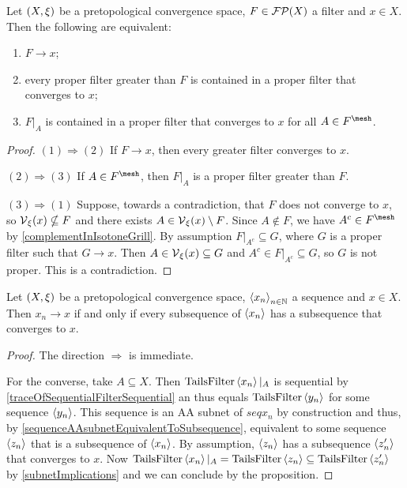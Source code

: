 \begin{proposition} \label{pretopologicalConvergenceDeterminedBySuperSuperFilters}
Let $\sSet{X,\xi}$ be a pretopological convergence space, $F\in\operatorname{\mathcal{FP}}(X)$ a filter and $x\in X$. Then the following are equivalent:
\begin{enumerate}
\item $F\to x$;
\item every proper filter greater than $F$ is contained in a proper filter that converges to $x$;
\item $F|_A$ is contained in a proper filter that converges to $x$ for all $A\in F^\mesh$.
\end{enumerate}
\end{proposition}
\begin{proof}
$(1)\Rightarrow (2)$ If $F\to x$, then every greater filter converges to $x$.

$(2) \Rightarrow (3)$ If $A\in F^\mesh$, then $F|_A$ is a proper filter greater than $F$.

$(3)\Rightarrow (1)$ Suppose, towards a contradiction, that $F$ does not converge to $x$, so $\operatorname{\mathcal{V}}_\xi(x)\nsubseteq F$ and there exists $A\in \operatorname{\mathcal{V}}_\xi(x) \setminus F$. Since $A\notin F$, we have $A^c\in F^\mesh$ by \ref{complementInIsotoneGrill}. By assumption $F|_{A^c} \subseteq G$, where $G$ is a proper filter such that $G\to x$. Then $A\in \operatorname{\mathcal{V}}_\xi(x) \subseteq G$ and $A^c \in F|_{A^c} \subseteq G$, so $G$ is not proper. This is a contradiction.
\end{proof}
\begin{corollary} \label{pretopologicalConvergenceDeterminedBySubsubsequence}
Let $\sSet{X,\xi}$ be a pretopological convergence space, $\left\langle x_n \right\rangle_{n\in \mathbb{N}}$ a sequence and $x\in X$. Then $x_n\to x$ \textup{if and only if} every subsequence of $\left\langle x_n \right\rangle$ has a subsequence that converges to $x$.
\end{corollary}
\begin{proof}
The direction $\Rightarrow$ is immediate.

For the converse, take $A\subseteq X$. Then $\operatorname{TailsFilter}\left\langle x_n \right\rangle|_A$ is sequential by \ref{traceOfSequentialFilterSequential} an thus equals $\operatorname{TailsFilter}\left\langle y_n \right\rangle$ for some sequence $\left\langle y_n \right\rangle$. This sequence is an AA subnet of $seq{x_n}$ by construction and thus, by \ref{sequenceAAsubnetEquivalentToSubsequence}, equivalent to some sequence $\left\langle z_n \right\rangle$ that is a subsequence of $\left\langle x_n \right\rangle$. By assumption, $\left\langle z_n \right\rangle$ has a subsequence $\left\langle z'_n \right\rangle$ that converges to $x$. Now $\operatorname{TailsFilter}\left\langle x_n \right\rangle|_A = \operatorname{TailsFilter}\left\langle z_n \right\rangle \subseteq \operatorname{TailsFilter}\left\langle z'_n \right\rangle$ by \ref{subnetImplications} and we can conclude by the proposition.
\end{proof}


